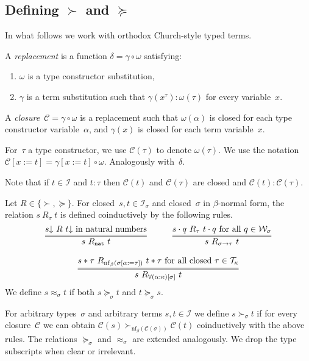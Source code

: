 \documentclass[runningheads,a4paper]{llncs}
\newcommand{\Iterms}{\mathcal{I}}
\newcommand{\World}{\mathcal{W}}
\newcommand{\cl}{\mathcal{C}}
\newcommand{\nf}{\mathrm{nf}}
\newcommand{\arrtype}{\rightarrow}
\newcommand{\app}[2]{#1 \cdot #2}
\newcommand{\tapp}[2]{#1 * #2}
\newcommand{\subst}[2]{#1:=#2}
\newcommand{\Tc}{\mathcal{T}}
\newcommand{\nat}{\mathtt{nat}}
\newcommand{\da}{\mathord{\downarrow}}
\begin{document}
\subsection{Defining $\succ$ and $\succeq$}

In what follows we work with orthodox Church-style typed terms.

\begin{definition}\label{def_closure}\normalfont
  A \emph{replacement} is a function $\delta = \gamma \circ \omega$
  satisfying:
  \begin{enumerate}
  \item $\omega$ is a type constructor substitution,
  \item $\gamma$ is a term substitution such that $\gamma(x^\tau) :
    \omega(\tau)$ for every variable~$x$.
  \end{enumerate}
  A \emph{closure}~$\cl = \gamma \circ \omega$ is a replacement such
  that $\omega(\alpha)$ is closed for each type constructor
  variable~$\alpha$, and $\gamma(x)$ is closed for each term
  variable~$x$.

  For~$\tau$ a type constructor, we use $\cl(\tau)$ to denote
  $\omega(\tau)$. We use the notation $\cl[\subst{x}{t}] =
  \gamma[\subst{x}{t}] \circ \omega$. Analogously with~$\delta$.
\end{definition}

Note that if $t \in \Iterms$ and $t : \tau$ then $\cl(t)$ and
$\cl(\tau)$ are closed and $\cl(t) : \cl(\tau)$.

\begin{definition}\label{def:succ}\normalfont
  Let $R \in \{ \succ,\succeq \}$. For closed~$s,t\in\Iterms_\sigma$
  and closed~$\sigma$ in $\beta$-normal form, the relation
  $s\ R_{\sigma}\ t$ is defined coinductively by the following rules.
  \[
  \begin{array}{cc}
    \infer={s\ R_\nat\ t}{s\da\ R\ t\da \text{ in natural numbers}} \quad&\quad
    \infer={s\ R_{\sigma\arrtype\tau}\ t}{\app{s}{q}\ R_{\tau}\ \app{t}{q} \text{ for all } q \in \World_\sigma} \\ \\
    \multicolumn{2}{c}{
    \infer={s\ R_{\forall(\alpha:\kappa)[\sigma]}\ t}{\tapp{s}{\tau}\ R_{\nf_\beta(\sigma[\subst{\alpha}{\tau}])}\ \tapp{t}{\tau} \text{ for all closed } \tau \in \Tc_{\kappa}}}
  \end{array}
  \]
  We define $s \approx_\sigma t$ if both $s \succeq_\sigma t$ and $t
  \succeq_\sigma s$.

  For arbitrary types~$\sigma$ and arbitrary terms $s,t \in \Iterms$
  we define $s \succ_\sigma t$ if for every closure~$\cl$ we can
  obtain $\cl(s) \succ_{\nf_\beta(\cl(\sigma))} \cl(t)$ coinductively
  with the above rules. The relations $\succeq_\sigma$ and
  $\approx_\sigma$ are extended analogously. We drop the type
  subscripts when clear or irrelevant.
\end{definition}
\end{document}
